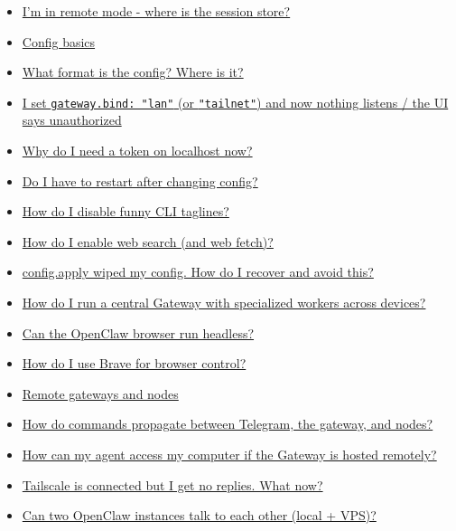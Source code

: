 \begin{itemize}
  \item \href{\#im-in-remote-mode-where-is-the-session-store}{I'm in remote mode - where is the session store?}
  \item \href{\#config-basics}{Config basics}
  \item \href{\#what-format-is-the-config-where-is-it}{What format is the config? Where is it?}
  \item \href{\#i-set-gatewaybind-lan-or-tailnet-and-now-nothing-listens-the-ui-says-unauthorized}{I set \texttt{gateway.bind: "lan"} (or \texttt{"tailnet"}) and now nothing listens / the UI says unauthorized}
  \item \href{\#why-do-i-need-a-token-on-localhost-now}{Why do I need a token on localhost now?}
  \item \href{\#do-i-have-to-restart-after-changing-config}{Do I have to restart after changing config?}
  \item \href{\#how-do-i-disable-funny-cli-taglines}{How do I disable funny CLI taglines?}
  \item \href{\#how-do-i-enable-web-search-and-web-fetch}{How do I enable web search (and web fetch)?}
  \item \href{\#configapply-wiped-my-config-how-do-i-recover-and-avoid-this}{config.apply wiped my config. How do I recover and avoid this?}
  \item \href{\#how-do-i-run-a-central-gateway-with-specialized-workers-across-devices}{How do I run a central Gateway with specialized workers across devices?}
  \item \href{\#can-the-openclaw-browser-run-headless}{Can the OpenClaw browser run headless?}
  \item \href{\#how-do-i-use-brave-for-browser-control}{How do I use Brave for browser control?}
  \item \href{\#remote-gateways-and-nodes}{Remote gateways and nodes}
  \item \href{\#how-do-commands-propagate-between-telegram-the-gateway-and-nodes}{How do commands propagate between Telegram, the gateway, and nodes?}
  \item \href{\#how-can-my-agent-access-my-computer-if-the-gateway-is-hosted-remotely}{How can my agent access my computer if the Gateway is hosted remotely?}
  \item \href{\#tailscale-is-connected-but-i-get-no-replies-what-now}{Tailscale is connected but I get no replies. What now?}
  \item \href{\#can-two-openclaw-instances-talk-to-each-other-local-vps}{Can two OpenClaw instances talk to each other (local + VPS)?}

\end{itemize}
